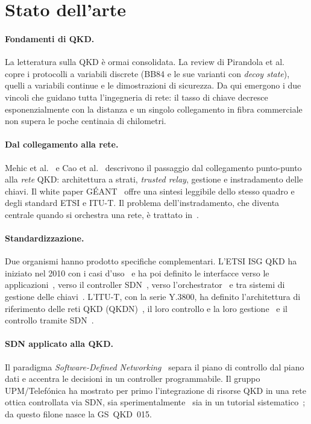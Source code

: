 \section{Stato dell'arte}
\label{sec:sota}

\paragraph{Fondamenti di QKD.}
La letteratura sulla QKD è ormai consolidata. La review di Pirandola
et al.~\cite{pirandola2020} copre i protocolli a variabili discrete (BB84 e
le sue varianti con \emph{decoy state}), quelli a variabili continue e le
dimostrazioni di sicurezza. Da qui emergono i due vincoli che guidano tutta
l'ingegneria di rete: il tasso di chiave decresce esponenzialmente con la
distanza e un singolo collegamento in fibra commerciale non supera le poche
centinaia di chilometri.

\paragraph{Dal collegamento alla rete.}
Mehic et al.~\cite{mehic2020} e Cao et al.~\cite{cao2022} descrivono il
passaggio dal collegamento punto-punto alla \emph{rete} QKD: architettura a
strati, \emph{trusted relay}, gestione e instradamento delle chiavi. Il
white paper GÉANT~\cite{geant2024} offre una sintesi leggibile dello stesso
quadro e degli standard ETSI e ITU-T. Il problema dell'instradamento, che
diventa centrale quando si orchestra una rete, è trattato
in~\cite{routing2024}.

\paragraph{Standardizzazione.}
Due organismi hanno prodotto specifiche complementari. L'ETSI ISG QKD ha
iniziato nel 2010 con i casi d'uso~\cite{qkd002} e ha poi definito le
interfacce verso le applicazioni~\cite{qkd004,qkd014}, verso il controller
SDN~\cite{qkd015}, verso l'orchestrator~\cite{qkd018} e tra sistemi di
gestione delle chiavi~\cite{qkd020}. L'ITU-T, con la serie Y.3800, ha
definito l'architettura di riferimento delle reti QKD
(QKDN)~\cite{ituy3800}, il loro controllo e la loro
gestione~\cite{ituy3804} e il controllo tramite SDN~\cite{ituy3805}.

\paragraph{SDN applicato alla QKD.}
Il paradigma \emph{Software-Defined Networking}~\cite{kreutz2015} separa il
piano di controllo dal piano dati e accentra le decisioni in un controller
programmabile. Il gruppo UPM/Telefónica ha mostrato per primo
l'integrazione di risorse QKD in una rete ottica controllata via SDN, sia
sperimentalmente~\cite{aguado2016} sia in un tutorial
sistematico~\cite{aguado2020}; da questo filone nasce la GS~QKD~015.

